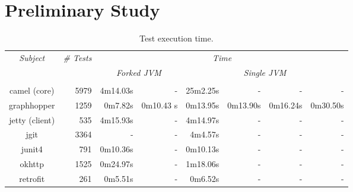 \section{Preliminary Study}

\begin{table*}[t]
  \centering
  \begin{tabular}{|c|r|r|r|r|r|r|r|}
    \hline
    \multirow{2}{*}{\emph{Subject}} & \multirow{2}{*}{\emph{\# Tests}} &  \multicolumn{6}{c|}{\emph{Time}}\\
    \cline{3-8}
    & & \multicolumn{2}{c|}{\emph{Forked JVM}} & \multicolumn{4}{c|}{\emph{Single JVM}}   \\
    \cline{3-8}
    & & \multicolumn{1}{c|}{\Seq{}} & \multicolumn{1}{c|}{\ParClassSeqMeth{}} & \multicolumn{1}{c|}{\Seq{}} & \multicolumn{1}{c|}{\ParClassSeqMeth{}} & \multicolumn{1}{c|}{\SeqClassParMeth{}} & \multicolumn{1}{c|}{\ParClassParMeth{}}\\     \hline
    camel (core) & 5979 & 4m14.03s & - & 25m2.25s & - & - & - \\
    \hline
    graphhopper & 1259 & 0m7.82s & 0m10.43 s & 0m13.95s & 0m13.90s & 0m16.24s & 0m30.50s \\
    \hline
    jetty (client) & 535 & 4m15.93s & - & 4m14.97s & - & - & - \\
    \hline
    jgit & 3364 & - & - & 4m4.57s & - & - & - \\
    \hline
    junit4 & 791 & 0m10.36s & - & 0m10.13s & - & - & - \\
    \hline
    okhttp & 1525 & 0m24.97s & - & 1m18.06s & - & - & - \\
    \hline
    retrofit & 261 & 0m5.51s & - & 0m6.52s & - & - & - \\
    \hline
  \end{tabular}
  \caption{\label{table:cost}Test execution time.}
\end{table*}


